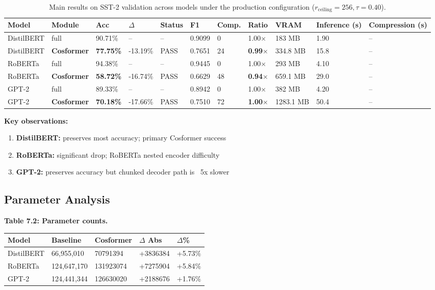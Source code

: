 \begin{table}[t]
\centering
\small
\begin{tabular}{lllllllllll}
\toprule
\textbf{Model} & \textbf{Module} & \textbf{Acc} & \textbf{$\Delta$} & \textbf{Status} & \textbf{F1} & \textbf{Comp.} & \textbf{Ratio} & \textbf{VRAM} & \textbf{Inference (s)} & \textbf{Compression (s)} \\
\midrule
DistilBERT & full & 90.71\% & -- & -- & 0.9099 & 0 & 1.00$\times$ & 183 MB & 1.90 & -- \\
DistilBERT & \textbf{Cosformer} & \textbf{77.75\%} & -13.19\% & PASS & 0.7651 & 24 & \textbf{0.99$\times$} & 334.8 MB & 15.8 & -- \\
RoBERTa & full & 94.38\% & -- & -- & 0.9445 & 0 & 1.00$\times$ & 293 MB & 4.10 & -- \\
RoBERTa & \textbf{Cosformer} & \textbf{58.72\%} & -16.74\% & PASS & 0.6629 & 48 & \textbf{0.94$\times$} & 659.1 MB & 29.0 & -- \\
GPT-2 & full & 89.33\% & -- & -- & 0.8942 & 0 & 1.00$\times$ & 382 MB & 4.20 & -- \\
GPT-2 & \textbf{Cosformer} & \textbf{70.18\%} & -17.66\% & PASS & 0.7510 & 72 & \textbf{1.00$\times$} & 1283.1 MB & 50.4 & -- \\
\bottomrule
\end{tabular}
\caption{Main results on SST-2 validation across models under the production configuration ($r_{\mathrm{ceiling}}=256, \tau=0.40$).}
\label{tab:main_sst2}
\end{table}

\textbf{Key observations:}

\begin{enumerate}
\item \textbf{DistilBERT:} preserves most accuracy; primary Cosformer success
\item \textbf{RoBERTa:} significant drop; RoBERTa nested encoder difficulty
\item \textbf{GPT-2:} preserves accuracy but chunked decoder path is ~5x slower

\end{enumerate}
\subsection{Parameter Analysis}

\textbf{Table 7.2: Parameter counts.}

\begin{table}[H]
\centering
\small
\begin{tabular}{lllll}
\toprule
\textbf{Model} & \textbf{Baseline} & \textbf{Cosformer} & \textbf{$\Delta$ Abs} & \textbf{$\Delta$\%} \\
\midrule
DistilBERT & 66,955,010 & 70791394 & +3836384 & +5.73\% \\
RoBERTa & 124,647,170 & 131923074 & +7275904 & +5.84\% \\
GPT-2 & 124,441,344 & 126630020 & +2188676 & +1.76\% \\
\bottomrule
\end{tabular}
\end{table}

